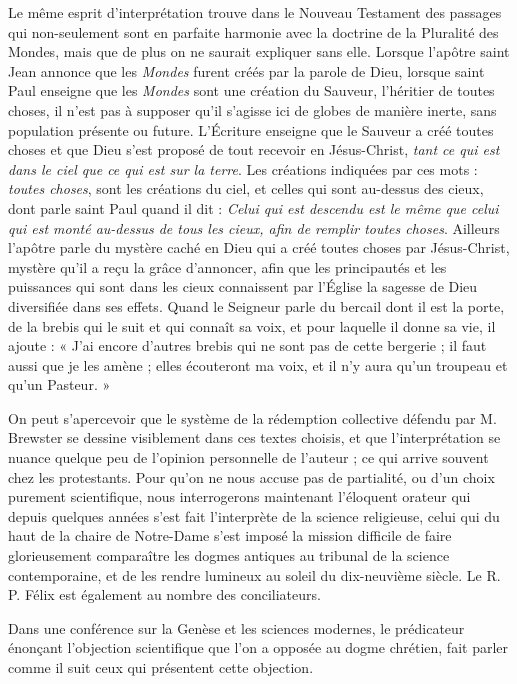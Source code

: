 \documentclass[a4paper, 11pt, oneside]{article}
\begin{document}
Le même esprit d'interprétation trouve dans le Nouveau Testament des passages qui non-seulement sont en parfaite harmonie avec la doctrine de la Pluralité des Mondes, mais que de plus on ne saurait expliquer sans elle. Lorsque l'apôtre saint Jean annonce que les \emph{Mondes} furent créés par la parole de Dieu, lorsque saint Paul enseigne que les \emph{Mondes} sont une création du Sauveur, l'héritier de toutes choses, il n'est pas à supposer qu'il s'agisse ici de globes de manière inerte, sans population présente ou future. L'Écriture enseigne que le Sauveur a créé toutes choses et que Dieu s'est proposé de tout recevoir en Jésus-Christ, \emph{tant ce qui est dans le ciel que ce qui est sur la terre}. Les créations indiquées par ces mots : \emph{toutes choses}, sont les créations du ciel, et celles qui sont au-dessus des cieux, dont parle saint Paul quand il dit : \emph{Celui qui est descendu est le même que celui qui est monté au-dessus de tous les cieux, afin de remplir toutes choses}. Ailleurs l'apôtre parle du mystère caché en Dieu qui a créé toutes choses par Jésus-Christ, mystère qu'il a reçu la grâce d'annoncer, afin que les principautés et les puissances qui sont dans les cieux connaissent par l'Église la sagesse de Dieu diversifiée dans ses effets. Quand le Seigneur parle du bercail dont il est la porte, de la brebis qui le suit et qui connaît sa voix, et pour laquelle il donne sa vie, il ajoute : « J'ai encore d'autres brebis qui ne sont pas de cette bergerie ; il faut aussi que je les amène ; elles écouteront ma voix, et il n'y aura qu'un troupeau et qu'un Pasteur. »

On peut s'apercevoir que le système de la rédemption collective défendu par M. Brewster se dessine visiblement dans ces textes choisis, et que l'interprétation se nuance quelque peu de l'opinion personnelle de l'auteur ; ce qui arrive souvent chez les protestants. Pour qu'on ne nous accuse pas de partialité, ou d'un choix purement scientifique, nous interrogerons maintenant l'éloquent orateur qui depuis quelques années s'est fait l'interprète de la science religieuse, celui qui du haut de la chaire de Notre-Dame s'est imposé la mission difficile de faire glorieusement comparaître les dogmes antiques au tribunal de la science contemporaine, et de les rendre lumineux au soleil du dix-neuvième siècle. Le R. P. Félix est également au nombre des conciliateurs.

Dans une conférence sur la Genèse et les sciences modernes, le prédicateur énonçant l'objection scientifique que l'on a opposée au dogme chrétien, fait parler comme il suit ceux qui présentent cette objection.
\end{document}
